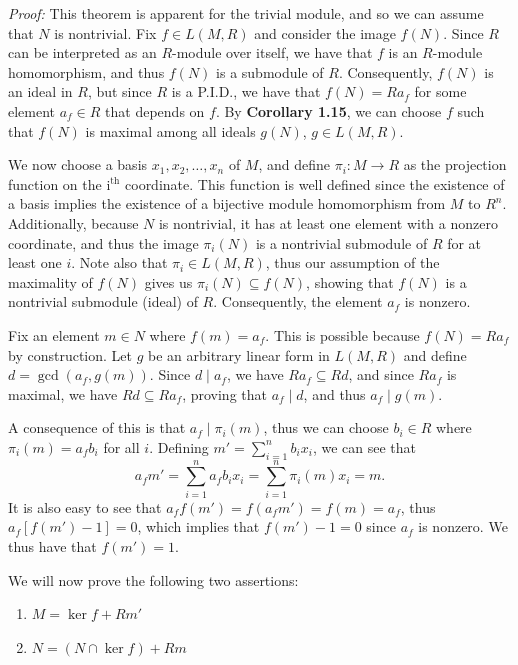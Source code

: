 \documentclass[12pt]{article}
\newcommand{\proof}{\textit{Proof: }}
\begin{document}
\proof
This theorem is apparent for the trivial module, and so we can assume that
\( N \) is nontrivial.
Fix \( f \in L(M,R) \) and consider the image \( f(N) \).
Since \( R \) can be interpreted as an \( R \)-module over itself, we have that
\( f \) is an \( R \)-module homomorphism, and thus \( f(N) \) is a submodule
of \( R \).
Consequently, \( f(N) \) is an ideal in \( R \), but since \( R \) is a P.I.D.,
we have that \( f(N) = Ra_f \) for some element \( a_f \in R \) that depends on
\( f \).
By \textbf{Corollary 1.15}, we can choose \( f \) such that \( f(N) \) is
maximal among all ideals \( g(N) \), \( g \in L(M,R) \).

We now choose a basis \( x_1, x_2, \dots, x_n \) of \( M \), and define
\( \pi_i : M \to R \) as the projection function on the
\( \text{i}^{\text{th}} \) coordinate.
This function is well defined since the existence of a basis implies the
existence of a bijective module homomorphism from \( M \) to \( R^n \).
Additionally, because \( N \) is nontrivial, it has at least one element
with a nonzero coordinate, and thus the image \( \pi_i(N) \) is a nontrivial
submodule of \( R \) for at least one \( i \).
Note also that \( \pi_i \in L(M,R) \), thus our assumption of the maximality
of \( f(N) \) gives us \( \pi_i(N) \subseteq f(N) \), showing that
\( f(N) \) is a nontrivial submodule (ideal) of \( R \).
Consequently, the element \( a_f \) is nonzero.

Fix an element \( m \in N \) where \( f(m) = a_f \).
This is possible because \( f(N) = Ra_f \) by construction.
Let \( g \) be an arbitrary linear form in \( L(M,R) \) and define
\( d = \gcd(a_f, g(m)) \).
Since \( d \mid a_f \), we have \( Ra_f \subseteq Rd \), and since
\( Ra_f \) is maximal, we have \( Rd \subseteq Ra_f \), proving
that \( a_f \mid d \), and thus \( a_f \mid g(m) \).

A consequence of this is that \( a_f \mid \pi_i(m) \), thus we can choose
\( b_i \in R \) where \( \pi_i(m) = a_fb_i \) for all \( i \).
Defining \( m' = \sum_{i = 1}^n b_ix_i \), we can see that
\[
	a_fm'
	= \sum_{i = 1}^n a_fb_ix_i
	= \sum_{i = 1}^n \pi_i(m)x_i
	= m.
\]
It is also easy to see that \( a_ff(m') = f(a_fm') = f(m) = a_f \), thus
\( a_f[f(m') - 1] = 0 \), which implies that \( f(m') - 1 = 0 \) since
\( a_f \) is nonzero.
We thus have that \( f(m') = 1 \).

We will now prove the following two assertions:
\begin{enumerate}[(1)]
	\item \( M = \ker f + Rm' \)

	\item \( N = (N \cap \ker f) + Rm \)
\end{enumerate}
\end{document}
